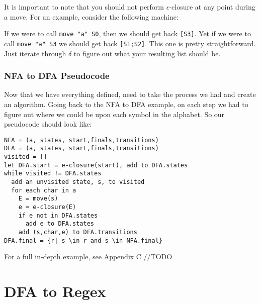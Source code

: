 \documentclass[main.tex]{subfiles}
\begin{document}
It is important to note that you should not perform $\epsilon$-closure at any point during a move. For an example, consider the following machine: 
\begin{center}
\end{center}

If we were to call \texttt{move "a" S0}, then we should get back \texttt{[S3]}. Yet if we were to call \texttt{move "a" S3} we should get back \texttt{[S1;S2]}. This one is pretty straightforward. Just iterate through $\delta$ to figure out what your resulting list should be. 

\subsubsection{NFA to DFA Pseudocode}

Now that we have everything defined, need to take the process we had and create an algorithm. 
Going back to the NFA to DFA example, on each step we had to figure out where we could be upon each symbol in the alphabet. So our pseudocode should look like: 
\begin{lstlisting}
NFA = (a, states, start,finals,transitions)
DFA = (a, states, start,finals,transitions)
visited = []
let DFA.start = e-closure(start), add to DFA.states 
while visited != DFA.states
  add an unvisited state, s, to visited
  for each char in a
    E = move(s)
    e = e-closure(E)
    if e not in DFA.states
      add e to DFA.states
    add (s,char,e) to DFA.transitions
DFA.final = {r| s \in r and s \in NFA.final}
\end{lstlisting}

For a full in-depth example, see Appendix C //TODO
\section{DFA to Regex}
\end{document}
